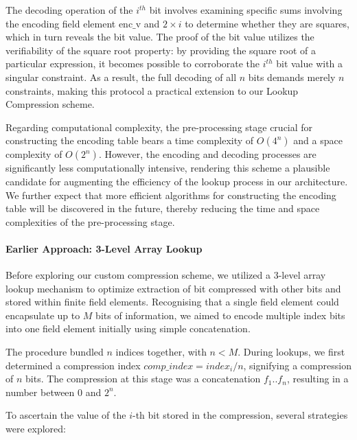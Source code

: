 \documentclass{article}[12pt]
\begin{document}
The decoding operation of the $i^{th}$ bit involves examining specific sums involving the encoding field element $\text{enc_v}$ and $2 \times i$ to determine whether they are squares, which in turn reveals the bit value.
The proof of the bit value utilizes the verifiability of the square root property: by providing the square root of a particular expression, it becomes possible to corroborate the $i^{th}$ bit value with a singular constraint.
As a result, the full decoding of all $n$ bits demands merely $n$ constraints, making this protocol a practical extension to our Lookup Compression scheme.

Regarding computational complexity, the pre-processing stage crucial for constructing the encoding table bears a time complexity of \(O(4^n)\) and a space complexity of \(O(2^n)\).
However, the encoding and decoding processes are significantly less computationally intensive, rendering this scheme a plausible candidate for augmenting the efficiency of the lookup process in our architecture.
We further expect that more efficient algorithms for constructing the encoding table will be discovered in the future, thereby reducing the time and space complexities of the pre-processing stage.

\paragraph{Earlier Approach: 3-Level Array Lookup}
Before exploring our custom compression scheme, we utilized a 3-level array lookup mechanism to optimize extraction of bit compressed with other bits and stored within finite field elements.
Recognising that a single field element could encapsulate up to \( M \) bits of information, we aimed to encode multiple index bits into one field element initially using simple concatenation.

The procedure bundled \( n \) indices together, with \( n < M \).
During lookups, we first determined a compression index \( comp\_index = index_i / n \), signifying a compression of \( n \) bits.
The compression at this stage was a concatenation \( f_1..f_n \), resulting in a number between 0 and \( 2^n \).

To ascertain the value of the \( i \)-th bit stored in the compression, several strategies were explored:
\end{document}
